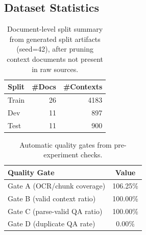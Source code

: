 \subsection{Dataset Statistics}
\begin{table}[t]
\centering
\small
\begin{tabular}{lrr}
\hline
Split & \#Docs & \#Contexts \\
\hline
Train & 26 & 4183 \\
Dev   & 11 & 897 \\
Test  & 11 & 900 \\
\hline
\end{tabular}
\caption{Document-level split summary from generated split artifacts (seed=42), after pruning context documents not present in raw sources.}
\label{tab:split_stats}
\end{table}

\begin{table}[t]
\centering
\small
\begin{tabular}{lc}
\hline
Quality Gate & Value \\
\hline
Gate A (OCR/chunk coverage) & 106.25\% \\
Gate B (valid context ratio) & 100.00\% \\
Gate C (parse-valid QA ratio) & 100.00\% \\
Gate D (duplicate QA rate) & 0.00\% \\
\hline
\end{tabular}
\caption{Automatic quality gates from pre-experiment checks.}
\label{tab:quality_gates}
\end{table}

